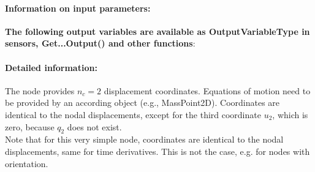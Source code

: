 \paragraph{Information on input parameters:} 
\finishTable
{\bf The following output variables are available as OutputVariableType in sensors, Get...Output() and other functions}: 
\finishTable
 \noindent
    \paragraph{Detailed information:}
    The node provides $n_c=2$ displacement coordinates. Equations of motion need to be provided by an according object (e.g., MassPoint2D).
    Coordinates are identical to the nodal displacements, except for the third coordinate $u_2$, which is zero, because $q_2$ does not exist. \vspace{6pt}\\
    Note that for this very simple node, coordinates are identical to the nodal displacements, same for time derivatives. This is not the case, e.g. for nodes with orientation. \vspace{6pt}\\
    
